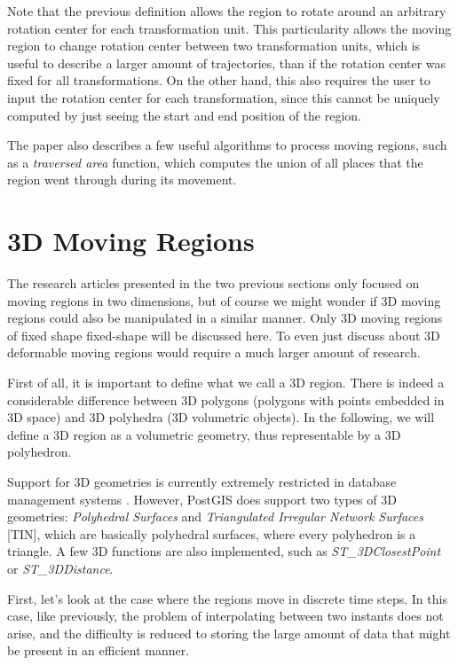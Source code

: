 Note that the previous definition allows the region to rotate around an arbitrary rotation center for each transformation unit. This particularity allows the moving region to change rotation center between two transformation units, which is useful to describe a larger amount of trajectories, than if the rotation center was fixed for all transformations. On the other hand, this also requires the user to input the rotation center for each transformation, since this cannot be uniquely computed by just seeing the start and end position of the region.

The paper  also describes a few useful algorithms to process moving regions, such as a \textit{traversed area} function, which computes the union of all places that the region went through during its movement.

\section{3D Moving Regions}

The research articles presented in the two previous sections only focused on moving regions in two dimensions, but of course we might wonder if 3D moving regions could also be manipulated in a similar manner. Only 3D moving regions of fixed shape fixed-shape will be discussed here. To even just discuss about 3D deformable moving regions would require a much larger amount of research.

First of all, it is important to define what we call a 3D region. There is indeed a considerable difference between 3D polygons (polygons with points embedded in 3D space) and 3D polyhedra (3D volumetric objects). In the following, we will define a 3D region as a volumetric geometry, thus representable by a 3D polyhedron.


Support for 3D geometries is currently extremely restricted in database management systems . However, PostGIS does support two types of 3D geometries: \textit{Polyhedral Surfaces} and \textit{Triangulated Irregular Network Surfaces} [TIN], which are basically polyhedral surfaces, where every polyhedron is a triangle. A few 3D functions are also implemented, such as \textit{ST\_3DClosestPoint} or \textit{ST\_3DDistance}.

First, let's look at the case where the regions move in discrete time steps. In this case, like previously, the problem of interpolating between two instants does not arise, and the difficulty is reduced to storing the large amount of data that might be present in an efficient manner. 

